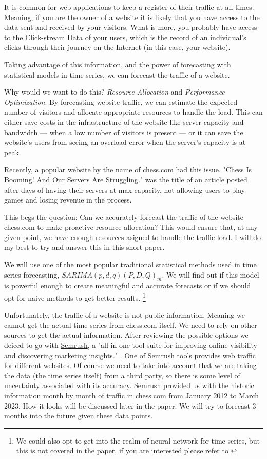 \documentclass[journal]{IEEEtran}
\begin{document}
It is common for web applications to keep a register of their traffic at all
times. Meaning, if you are the owner of a website it is likely that you have
access to the data sent and received by your visitors. What is more, you
probably have access to the Click-stream Data of your users, which is the record
of an individual’s clicks through their journey on the Internet (in this case,
your website).

Taking advantage of this information, and the power of forecasting with
statistical models in time series, we can forecast the traffic of a website.

Why would we want to do this? \emph{Resource Allocation} and \emph{Performance
Optimization}. By forecasting website traffic, we can estimate the expected
number of visitors and allocate appropriate resources to handle the load. This
can either save costs in the infrastructure of the website like server
capacity and bandwidth --- when a low number of visitors is present --- or it can
save the website's users from seeing an overload error when the server's
capacity is at peak.

Recently, a popular website by the name of \href{https://chess.com}{chess.com}
had this issue.  "Chess Is Booming! And Our Servers Are Struggling."
\cite{chesscom} was the title of an article posted after days of having their
servers at max capacity, not allowing users to play games and losing revenue in
the process.

This begs the question: Can we accurately forecast the traffic of the website
chess.com to make proactive resource allocation? This  would ensure that, at
any given point, we have enough resources asigned to handle the traffic load. I
will do my best to try and answer this in this short paper.

We will use one of the most popular traditional statistical methods used in
time series forecasting, $SARIMA(p,d,q)(P,D,Q)_m$. We will find out if this
model is powerful enough to create meaningful and accurate forecasts or if we
should opt for naive methods to get better results. \footnote{We could also opt
to get into the realm of neural network for time series, but this is not
covered in the paper, if you are interested please refer to \cite{nn}}

Unfortunately, the traffic of a website is not public information. Meaning we
cannot get the actual time series from chess.com itself. We need to rely on
other sources to get the actual information. After reviewing the possible
options we deiced to go with  \href{http://semrush.com}{Semrush}, a "all-in-one
tool suite for improving online visibility and discovering marketing insights."
\cite{semrush}. One of Semrush tools provides web traffic for different
websites. Of course we need to take into account that we are taking the data
(the time series itself) from a third party, so there is some level of
uncertainty associated with its accuracy. Semrush provided us with the historic
information month by month of traffic in chess.com from January 2012 to March
2023. How it looks will be discussed later in the paper. We will try to
forecast 3 months into the future given these data points.
\end{document}
